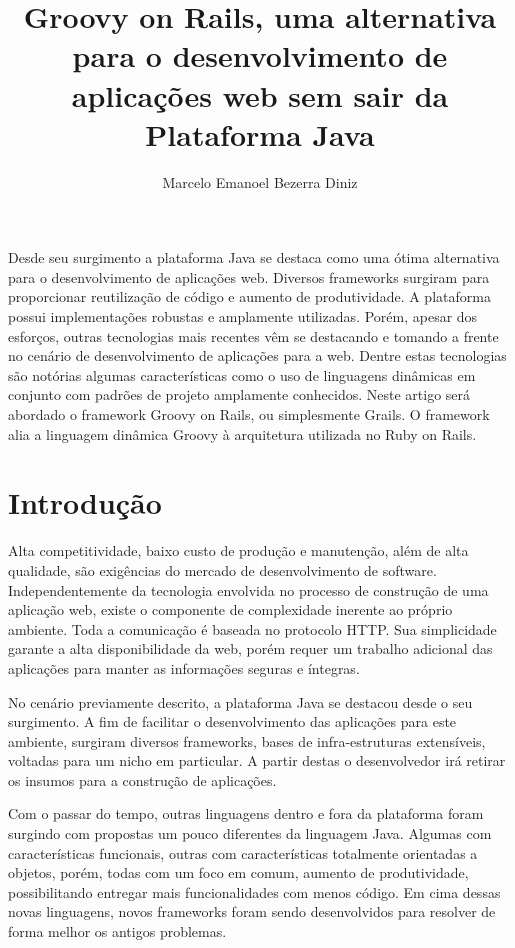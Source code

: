 \documentclass[12pt]{article}
\title{Groovy on Rails, uma alternativa para o desenvolvimento de aplicações web
       sem sair da Plataforma Java}
\author{Marcelo Emanoel Bezerra Diniz\inst{1}}
\begin{document}
 

\maketitle

\begin{resumo} 
    
    Desde seu surgimento a plataforma Java se destaca como uma ótima alternativa
    para o desenvolvimento de aplicações web. Diversos frameworks surgiram para 
    proporcionar reutilização de código e aumento de produtividade. A plataforma
    possui implementações robustas e amplamente utilizadas. Porém, apesar dos 
    esforços, outras tecnologias mais recentes vêm se destacando e tomando a 
    frente no cenário de desenvolvimento de aplicações para a web. Dentre estas 
    tecnologias são notórias algumas características como o uso de linguagens 
    dinâmicas em conjunto com padrões de projeto amplamente conhecidos. Neste 
    artigo será abordado o framework Groovy on Rails, ou simplesmente Grails. 
    O framework alia a linguagem dinâmica Groovy à arquitetura utilizada no Ruby 
    on Rails. \nocite{*}
    
\end{resumo}

\section{Introdução}

    Alta competitividade, baixo custo de produção e manutenção, além de alta 
    qualidade, são exigências do mercado de desenvolvimento de software. 
    Independentemente da tecnologia envolvida no processo de construção de uma 
    aplicação web, existe o componente de complexidade inerente ao próprio 
    ambiente. Toda a comunicação é baseada no protocolo HTTP. Sua simplicidade 
    garante a alta disponibilidade da web, porém requer um trabalho adicional 
    das aplicações para manter as informações seguras e íntegras.

    No cenário previamente descrito, a plataforma Java se destacou desde o seu 
    sur\-gi\-men\-to. A fim de facilitar o desenvolvimento das aplicações para este 
    ambiente, surgiram diversos frameworks, bases de infra-estruturas 
    extensíveis, voltadas para um nicho em particular. A partir destas o 
    desenvolvedor irá retirar os insumos para a construção de aplicações.

    Com o passar do tempo, outras linguagens dentro e fora da plataforma foram 
    surgindo com propostas um pouco diferentes da linguagem Java. Algumas com 
    características funcionais, outras com características totalmente orientadas 
    a objetos, porém, todas com um foco em comum, aumento de produtividade, 
    possibilitando entregar mais funcionalidades com menos código. Em cima 
    dessas novas linguagens, novos frameworks foram sendo desenvolvidos para 
    resolver de forma melhor os antigos problemas.
    
\end{document}

